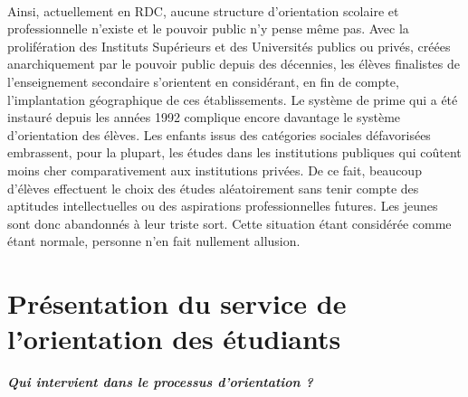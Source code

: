 \paragraph{}
Ainsi, actuellement en \ac{RDC}, aucune structure d’orientation scolaire et professionnelle n’existe et le pouvoir public n’y pense même pas. Avec la prolifération des Instituts Supérieurs et des Universités publics ou privés, créées anarchiquement par le pouvoir public depuis des décennies, les élèves finalistes de l’enseignement secondaire s’orientent en considérant, en fin de compte, l’implantation géographique de ces établissements. Le système de prime qui a été instauré depuis les années 1992 complique encore davantage le système d’orientation des élèves. Les enfants issus des catégories sociales défavorisées embrassent, pour la plupart, les études dans les institutions publiques qui coûtent moins cher comparativement aux institutions privées. De ce fait, beaucoup d’élèves effectuent le choix des études aléatoirement sans tenir compte des aptitudes intellectuelles ou des aspirations professionnelles futures. Les jeunes sont donc abandonnés à leur triste sort. Cette situation étant considérée comme étant normale, personne n’en fait nullement allusion.
\section{Présentation du service de l’orientation des étudiants}
\textbf{\textit{Qui intervient dans le processus d’orientation ?}} \\

